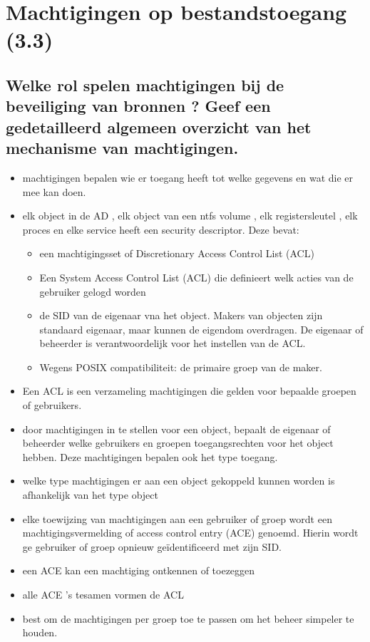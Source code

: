 \chapter{Machtigingen op bestandstoegang (3.3)}
\section{Welke rol spelen machtigingen bij de beveiliging van bronnen ? Geef een gedetailleerd algemeen overzicht van het mechanisme van machtigingen.}
\begin{itemize}
\item machtigingen bepalen wie er toegang heeft tot welke gegevens en wat die er mee kan doen.
\item elk object in de AD , elk object van een ntfs volume , elk registersleutel , elk proces en elke service heeft een security descriptor. Deze bevat:
\begin{itemize}
\item een machtigingsset of Discretionary Access Control List (ACL)
\item Een System Access Control List (ACL) die definieert welk acties van de gebruiker gelogd worden
\item de SID van de eigenaar vna het object. Makers van objecten zijn standaard eigenaar, maar kunnen de eigendom overdragen. De eigenaar of beheerder is verantwoordelijk voor het instellen van de ACL.
\item Wegens POSIX compatibiliteit: de primaire groep van de maker.
\end{itemize}
\item Een ACL is een verzameling machtigingen die gelden voor bepaalde groepen of gebruikers.
\item door machtigingen in te stellen voor een object, bepaalt de eigenaar of beheerder welke gebruikers en groepen toegangsrechten voor het object hebben. Deze machtigingen bepalen ook het type toegang. 
\item welke type machtigingen er aan een object gekoppeld kunnen worden is afhankelijk van het type object
\item elke toewijzing van machtigingen aan een gebruiker of groep wordt een machtigingsvermelding of access control entry (ACE) genoemd. Hierin wordt ge gebruiker of groep opnieuw ge\"identificeerd met zijn SID.
\item een ACE kan een machtiging ontkennen of toezeggen
\item alle ACE 's tesamen vormen de ACL
\item best om de machtigingen per groep toe te passen om het beheer simpeler te houden.

\end{itemize}
